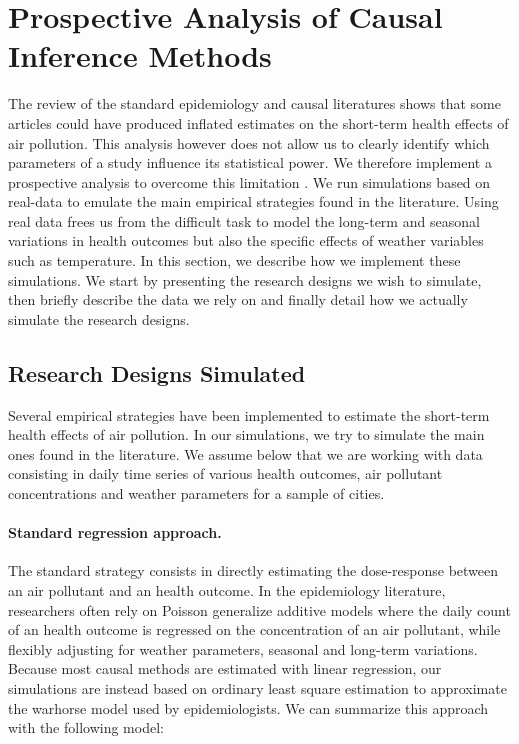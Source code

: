 \documentclass[12pt]{article}
\begin{document}



\section{Prospective Analysis of Causal Inference Methods}

        The review of the standard epidemiology and causal literatures shows that some articles could have produced inflated estimates on the short-term health effects of air pollution. This analysis however does not allow us to clearly identify which parameters of a study influence its statistical power. We therefore implement a prospective analysis to overcome this limitation \citep{gelman_beyond_2014, altoe_enhancing_2020}. We run simulations based on real-data to emulate the main empirical strategies found in the literature. Using real data frees us from the difficult task to model the long-term and seasonal variations in health outcomes but also the specific effects of weather variables such as temperature. In this section, we describe how we implement these simulations. We start by presenting the research designs we wish to simulate, then briefly describe the data we rely on and finally detail how we actually simulate the research designs.
        

    \subsection{Research Designs Simulated}
        
        Several empirical strategies have been implemented to estimate the short-term health effects of air pollution. In our simulations, we try to simulate the main ones found in the literature. We assume below that we are working with data consisting in daily time series of various health outcomes, air pollutant concentrations and weather parameters for a sample of cities.
        
        \paragraph{Standard regression approach.} The standard strategy consists in directly estimating the dose-response between an air pollutant and an health outcome. In the epidemiology literature, researchers often rely on Poisson generalize additive models where the daily count of an health outcome is regressed on the concentration of an air pollutant, while flexibly adjusting for weather parameters, seasonal and long-term variations. Because most causal methods are estimated with linear regression, our simulations are instead based on ordinary least square estimation to approximate the warhorse model used by epidemiologists. We can summarize this approach with the following model:
        
\end{document}

